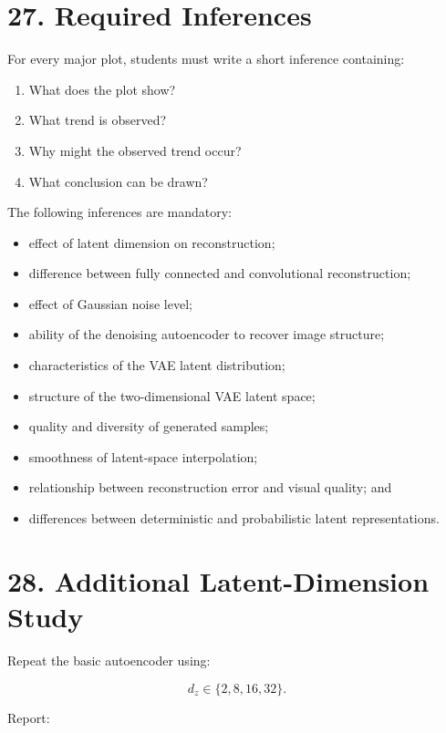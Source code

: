 \documentclass[10pt]{article}
\begin{document}
\section*{27. Required Inferences}

For every major plot, students must write a short inference containing:

\begin{enumerate}
\item What does the plot show?
\item What trend is observed?
\item Why might the observed trend occur?
\item What conclusion can be drawn?
\end{enumerate}

The following inferences are mandatory:

\begin{itemize}
\item effect of latent dimension on reconstruction;
\item difference between fully connected and convolutional reconstruction;
\item effect of Gaussian noise level;
\item ability of the denoising autoencoder to recover image structure;
\item characteristics of the VAE latent distribution;
\item structure of the two-dimensional VAE latent space;
\item quality and diversity of generated samples;
\item smoothness of latent-space interpolation;
\item relationship between reconstruction error and visual quality; and
\item differences between deterministic and probabilistic latent representations.
\end{itemize}

\section*{28. Additional Latent-Dimension Study}

Repeat the basic autoencoder using:

\[
d_z\in\{2,8,16,32\}.
\]

Report:
\end{document}
